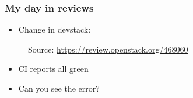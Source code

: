 \documentclass[aspectratio=169,11pt,hyperref={colorlinks=true}]{beamer}
\begin{document}
\begin{frame}
    \frametitle{My day in reviews}
    \begin{itemize}
        \item{Change in devstack:}
    \end{itemize}
    \begin{figure}
    
    \caption{Source: \href{https://review.openstack.org/\#/c/468060/2/lib/tempest@536}{https://review.openstack.org/468060}}
    \end{figure}
    \begin{itemize}
        \item{CI reports all green}
        \item{Can you see the error?}
    \end{itemize}
\end{frame}

\end{document}
